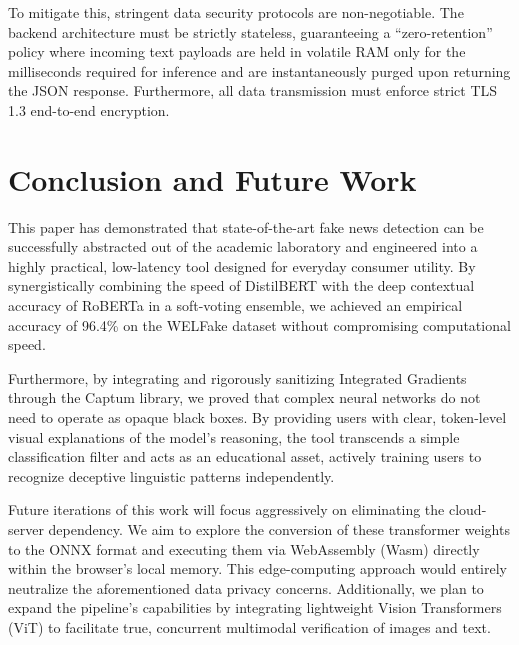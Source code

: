 \documentclass[conference]{IEEEtran}
\begin{document}
To mitigate this, stringent data security protocols are non-negotiable. The backend architecture must be strictly stateless, guaranteeing a ``zero-retention'' policy where incoming text payloads are held in volatile RAM only for the milliseconds required for inference and are instantaneously purged upon returning the JSON response. Furthermore, all data transmission must enforce strict TLS 1.3 end-to-end encryption. 

\section{Conclusion and Future Work}

This paper has demonstrated that state-of-the-art fake news detection can be successfully abstracted out of the academic laboratory and engineered into a highly practical, low-latency tool designed for everyday consumer utility. By synergistically combining the speed of DistilBERT with the deep contextual accuracy of RoBERTa in a soft-voting ensemble, we achieved an empirical accuracy of 96.4\% on the WELFake dataset without compromising computational speed. 

Furthermore, by integrating and rigorously sanitizing Integrated Gradients through the Captum library, we proved that complex neural networks do not need to operate as opaque black boxes. By providing users with clear, token-level visual explanations of the model's reasoning, the tool transcends a simple classification filter and acts as an educational asset, actively training users to recognize deceptive linguistic patterns independently.

Future iterations of this work will focus aggressively on eliminating the cloud-server dependency. We aim to explore the conversion of these transformer weights to the ONNX format and executing them via WebAssembly (Wasm) directly within the browser's local memory. This edge-computing approach would entirely neutralize the aforementioned data privacy concerns. Additionally, we plan to expand the pipeline's capabilities by integrating lightweight Vision Transformers (ViT) to facilitate true, concurrent multimodal verification of images and text.
\end{document}
